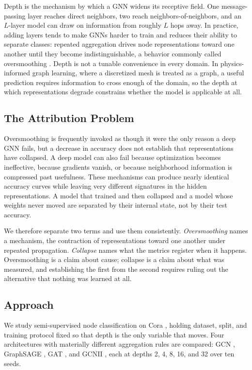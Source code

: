 \documentclass[
  conference]{IEEEtran}
\begin{document}
Depth is the mechanism by which a GNN widens its receptive field. One
message-passing layer reaches direct neighbors, two reach
neighbors-of-neighbors, and an \(L\)-layer model can draw on information
from roughly \(L\) hops away. In practice, adding layers tends to make
GNNs harder to train and reduces their ability to separate classes:
repeated aggregation drives node representations toward one another
until they become indistinguishable, a behavior commonly called
oversmoothing \citep{li2018deeper, oono2020graph}. Depth is not a
tunable convenience in every domain. In physics-informed graph learning,
where a discretized mesh is treated as a graph, a useful prediction
requires information to cross enough of the domain, so the depth at
which representations degrade constrains whether the model is applicable
at all.

\subsection{The Attribution Problem}\label{the-attribution-problem}

Oversmoothing is frequently invoked as though it were the only reason a
deep GNN fails, but a decrease in accuracy does not establish that
representations have collapsed. A deep model can also fail because
optimization becomes ineffective, because gradients vanish, or because
neighborhood information is compressed past usefulness. These mechanisms
can produce nearly identical accuracy curves while leaving very
different signatures in the hidden representations. A model that trained
and then collapsed and a model whose weights never moved are separated
by their internal state, not by their test accuracy.

We therefore separate two terms and use them consistently.
\emph{Oversmoothing} names a mechanism, the contraction of
representations toward one another under repeated propagation.
\emph{Collapse} names what the metrics register when it happens.
Oversmoothing is a claim about cause; collapse is a claim about what was
measured, and establishing the first from the second requires ruling out
the alternative that nothing was learned at all.

\subsection{Approach}\label{approach}

We study semi-supervised node classification on Cora
\citep{sen2008collective, yang2016revisiting}, holding dataset, split,
and training protocol fixed so that depth is the only variable that
moves. Four architectures with materially different aggregation rules
are compared: GCN \citep{kipf2017semi}, GraphSAGE
\citep{hamilton2017inductive}, GAT \citep{velickovic2018graph}, and
GCNII \citep{chen2020simple}, each at depths 2, 4, 8, 16, and 32 over
ten seeds.
\end{document}
